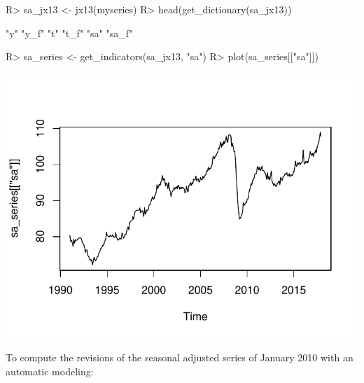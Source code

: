 \documentclass[article]{jss}
\begin{document}
\begin{CodeChunk}

\begin{CodeInput}
R> sa_jx13 <- jx13(myseries)
R> head(get_dictionary(sa_jx13))
\end{CodeInput}

\begin{CodeOutput}
[1] "y"    "y_f"  "t"    "t_f"  "sa"   "sa_f"
\end{CodeOutput}

\begin{CodeInput}
R> sa_series <- get_indicators(sa_jx13, "sa")
R> plot(sa_series[["sa"]])
\end{CodeInput}


\begin{center}\includegraphics{img/img-unnamed-chunk-27-1} \end{center}

\end{CodeChunk}

To compute the revisions of the seasonal adjusted series of January 2010
with an automatic modeling:
\end{document}
